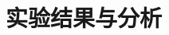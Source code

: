 \documentclass[aspectratio=43, xcolor=svgnames, t, 10pt]{beamer}
\begin{document}
\begin{frame}
%
%
%
\end{frame}

\section{实验结果与分析}
\end{document}

